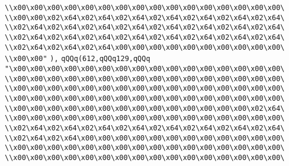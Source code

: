 \verb|\\x00\x00\x00\x00\x00\x00\x00\x00\x00\x00\x00\x00\x00\x00\x00\x00\|\newline
\verb|\\x00\x00\x02\x64\x02\x64\x02\x64\x02\x64\x02\x64\x02\x64\x02\x64\|\newline
\verb|\\x02\x64\x02\x64\x02\x64\x02\x64\x02\x64\x02\x64\x02\x64\x02\x64\|\newline
\verb|\\x02\x64\x02\x64\x02\x64\x02\x64\x02\x64\x02\x64\x02\x64\x02\x64\|\newline
\verb|\\x02\x64\x02\x64\x02\x64\x00\x00\x00\x00\x00\x00\x00\x00\x00\x00\|\newline
\verb|\\x00\x00"|\newline
\verb|),|\newline
\verb|qQQq(612,qQQq129,qQQq|\newline
\verb|"\x00\x00\x00\x00\x00\x00\x00\x00\x00\x00\x00\x00\x00\x00\x00\x00\|\newline
\verb|\\x00\x00\x00\x00\x00\x00\x00\x00\x00\x00\x00\x00\x00\x00\x00\x00\|\newline
\verb|\\x00\x00\x00\x00\x00\x00\x00\x00\x00\x00\x00\x00\x00\x00\x00\x00\|\newline
\verb|\\x00\x00\x00\x00\x00\x00\x00\x00\x00\x00\x00\x00\x00\x00\x00\x00\|\newline
\verb|\\x00\x00\x00\x00\x00\x00\x00\x00\x00\x00\x00\x00\x00\x00\x02\x64\|\newline
\verb|\\x00\x00\x00\x00\x00\x00\x00\x00\x00\x00\x00\x00\x00\x00\x00\x00\|\newline
\verb|\\x02\x64\x02\x64\x02\x64\x02\x64\x02\x64\x02\x64\x02\x64\x02\x64\|\newline
\verb|\\x02\x64\x02\x64\x00\x00\x00\x00\x00\x00\x00\x00\x00\x00\x00\x00\|\newline
\verb|\\x00\x00\x00\x00\x00\x00\x00\x00\x00\x00\x00\x00\x00\x00\x00\x00\|\newline
\verb|\\x00\x00\x00\x00\x00\x00\x00\x00\x00\x00\x00\x00\x00\x00\x00\x00\|\newline
